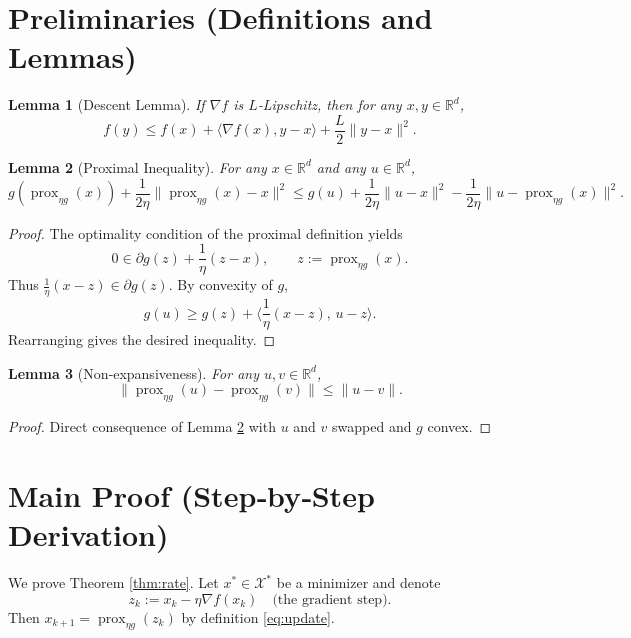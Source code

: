 \documentclass{article}
\newtheorem{lemma}{Lemma}
\begin{document}
\section*{Preliminaries (Definitions and Lemmas)}
\begin{lemma}[Descent Lemma]\label{lem:descent}
If $\nabla f$ is $L$‑Lipschitz, then for any $x,y\in\mathbb{R}^{d}$,
\[
f(y)\le f(x)+\langle\nabla f(x),y-x\rangle+\frac{L}{2}\|y-x\|^{2}.
\]
\end{lemma}
\begin{lemma}[Proximal Inequality]\label{lem:prox}
For any $x\in\mathbb{R}^{d}$ and any $u\in\mathbb{R}^{d}$,
\[
g(\operatorname{prox}_{\eta g}(x)) +\frac{1}{2\eta}\|\operatorname{prox}_{\eta g}(x)-x\|^{2}
\le g(u)+\frac{1}{2\eta}\|u-x\|^{2}-\frac{1}{2\eta}\|u-\operatorname{prox}_{\eta g}(x)\|^{2}.
\]
\end{lemma}
\begin{proof}
The optimality condition of the proximal definition yields
\[
0\in \partial g(z)+\frac{1}{\eta}(z-x),\qquad z:=\operatorname{prox}_{\eta g}(x).
\]
Thus $\frac{1}{\eta}(x-z)\in\partial g(z)$. By convexity of $g$,
\[
g(u)\ge g(z)+\langle \frac{1}{\eta}(x-z),\,u-z\rangle.
\]
Rearranging gives the desired inequality. \hfill\qedsymbol
\end{proof}
\begin{lemma}[Non‑expansiveness]\label{lem:nonexp}
For any $u,v\in\mathbb{R}^{d}$,
\[
\|\operatorname{prox}_{\eta g}(u)-\operatorname{prox}_{\eta g}(v)\|\le\|u-v\|.
\]
\end{lemma}
\begin{proof}
Direct consequence of Lemma \ref{lem:prox} with $u$ and $v$ swapped and $g$ convex. \hfill\qedsymbol
\end{proof}

\section*{Main Proof (Step‑by‑Step Derivation)}
We prove Theorem \ref{thm:rate}. Let $x^{*}\in\mathcal{X}^{*}$ be a minimizer and denote
\[
z_{k}:=x_{k}-\eta\nabla f(x_{k})\quad\text{(the gradient step)}.
\]
Then $x_{k+1}= \operatorname{prox}_{\eta g}(z_{k})$ by definition \eqref{eq:update}.
\end{document}
